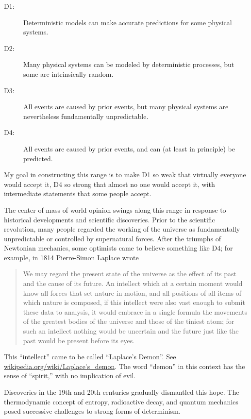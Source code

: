 \documentclass[10pt]{book}
\begin{document}
\begin{description}

\item[D1:] Deterministic models can make accurate predictions
for some physical systems.

\item[D2:] Many physical systems can be modeled by deterministic
processes, but some are intrinsically random.

\item[D3:] All events are caused by prior events, but many
physical systems are nevertheless fundamentally unpredictable.

\item[D4:] All events are caused by prior events, and can (at
least in principle) be predicted.

\end{description}

My goal in constructing this range is to make D1 so weak that
virtually everyone would accept it, D4 so strong that almost no one
would accept it, with intermediate statements that some people accept.

The center of mass of world opinion swings along this range in
response to historical developments and scientific discoveries.  Prior
to the scientific revolution, many people regarded the working of the
universe as fundamentally unpredictable or controlled by supernatural
forces.  After the triumphs of Newtonian mechanics, some optimists
came to believe something like D4; for example, in 1814 Pierre-Simon
Laplace wrote

\begin{quote}
We may regard the present state of the universe as the effect of its
past and the cause of its future. An intellect which at a certain
moment would know all forces that set nature in motion, and all
positions of all items of which nature is composed, if this intellect
were also vast enough to submit these data to analysis, it would
embrace in a single formula the movements of the greatest bodies of
the universe and those of the tiniest atom; for such an intellect
nothing would be uncertain and the future just like the past would be
present before its eyes.
\end{quote}

This ``intellect'' came to be called ``Laplace's Demon''.
See \url{wikipedia.org/wiki/Laplace's_demon}.  The word
``demon'' in this context has the sense of ``spirit,'' with no
implication of evil.

Discoveries in the 19th and 20th centuries gradually dismantled
this hope.  The thermodynamic concept of entropy, radioactive decay,
and quantum mechanics posed successive challenges to strong
forms of determinism.
\end{document}

